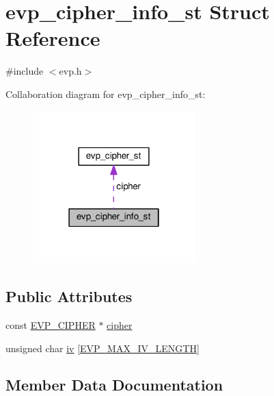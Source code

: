 \hypertarget{structevp__cipher__info__st}{}\section{evp\+\_\+cipher\+\_\+info\+\_\+st Struct Reference}
\label{structevp__cipher__info__st}


{\ttfamily \#include $<$evp.\+h$>$}



Collaboration diagram for evp\+\_\+cipher\+\_\+info\+\_\+st\+:
\nopagebreak
\begin{figure}[H]
\begin{center}
\leavevmode
\includegraphics[width=178pt]{structevp__cipher__info__st__coll__graph}
\end{center}
\end{figure}
\subsection*{Public Attributes}
\begin{DoxyCompactItemize}
\item 
const \hyperlink{ossl__typ_8h_a54a8663a8084d45c31f2786156b55405}{E\+V\+P\+\_\+\+C\+I\+P\+H\+ER} $\ast$ \hyperlink{structevp__cipher__info__st_a54d5bc0202fbebadb925e7e87e7ee544}{cipher}
\item 
unsigned char \hyperlink{structevp__cipher__info__st_a579960a9fa646b1f82ecf67293c8a819}{iv} \mbox{[}\hyperlink{evp_8h_a80893bc2dbae769441bf6a042cf4069e}{E\+V\+P\+\_\+\+M\+A\+X\+\_\+\+I\+V\+\_\+\+L\+E\+N\+G\+TH}\mbox{]}
\end{DoxyCompactItemize}


\subsection{Member Data Documentation}
